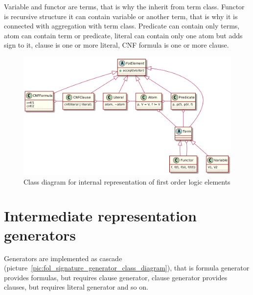 Variable and functor are terms, that is why the inherit from term class. Functor is recursive structure it can contain variable or another term, that is why it is connected with aggregation with term class. Predicate can contain only terms, atom can contain term or predicate, literal can contain only one atom but adds sign to it, clause is one or more literal, CNF formula is one or more clause.

\begin{figure}[h]
\begin{centering}
  \includegraphics[width=\textwidth]{logic-formula-generator/fol/cnf_fol_elements.png}
  \caption{Class diagram for internal representation of first order logic elements}
  \label{pic:fol_elements_class_diagram}
\end{centering}
\end{figure}

\section{Intermediate representation generators}
\label{sec:Generators}

Generators are implemented as cascade (picture~\ref{pic:fol_signature_generator_class_diagram}), that is formula generator provides formulas, but requires clause generator, clause generator provides clauses, but requires literal generator and so on.


